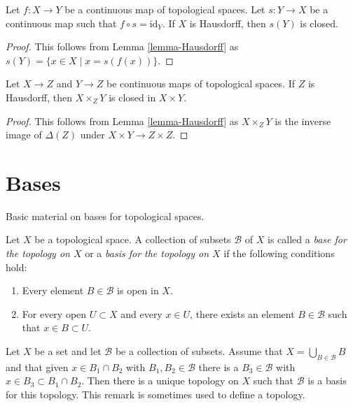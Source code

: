 \begin{lemma}
\label{lemma-section-closed}
Let $f : X \to Y$ be a continuous map of topological spaces.
Let $s : Y \to X$ be a continuous map such that $f \circ s = \text{id}_Y$.
If $X$ is Hausdorff, then $s(Y)$ is closed.
\end{lemma}

\begin{proof}
This follows from Lemma \ref{lemma-Hausdorff} as
$s(Y) = \{x \in X \mid x = s(f(x))\}$.
\end{proof}

\begin{lemma}
\label{lemma-fibre-product-closed}
Let $X \to Z$ and $Y \to Z$ be continuous maps of topological spaces.
If $Z$ is Hausdorff, then  $X \times_Z Y$ is closed in $X \times Y$.
\end{lemma}

\begin{proof}
This follows from Lemma \ref{lemma-Hausdorff} as
$X \times_Z Y$ is the inverse image of $\Delta(Z)$
under $X \times Y \to Z \times Z$.
\end{proof}






\section{Bases}
\label{section-bases}

\noindent
Basic material on bases for topological spaces.

\begin{definition}
\label{definition-base}
Let $X$ be a topological space. A collection of subsets $\mathcal{B}$ of $X$
is called a {\it base for the topology on $X$} or a {\it basis for the
topology on $X$} if the following conditions hold:
\begin{enumerate}
\item Every element $B \in \mathcal{B}$ is open in $X$.
\item For every open $U \subset X$ and every $x \in U$,
there exists an element $B \in \mathcal{B}$ such that
$x \in B \subset U$.
\end{enumerate}
\end{definition}

\noindent
Let $X$ be a set and let $\mathcal{B}$ be a collection of subsets.
Assume that $X = \bigcup_{B \in \mathcal{B}} B$ and that given
$x \in B_1 \cap B_2$ with $B_1, B_2 \in \mathcal{B}$ there is a
$B_3 \in \mathcal{B}$ with $x \in B_3 \subset B_1 \cap B_2$.
Then there is a unique topology on $X$ such that $\mathcal{B}$
is a basis for this topology. This remark is sometimes used
to define a topology.

